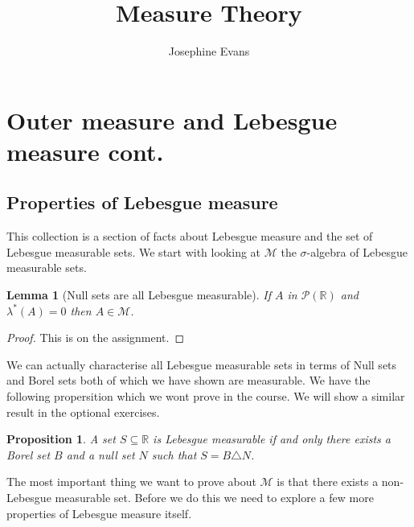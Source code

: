 \documentclass[11pt]{article}
\author{
Josephine Evans
}
\title{Measure Theory}
\newtheorem{lem}[thm]{Lemma}
\newtheorem{prp}[thm]{Proposition}
\theoremstyle{definition}
\theoremstyle{remark}
\begin{document}
\section{Outer measure and Lebesgue measure cont.}
\subsection{Properties of Lebesgue measure}
This collection is a section of facts about Lebesgue measure and the set of Lebesgue measurable sets. We start with looking at $\mathscr{M}$ the $\sigma$-algebra of Lebesgue measurable sets. 

\begin{lem}[Null sets are all Lebesgue measurable]
If $A$ in $\mathscr{P}(\mathbb{R})$ and $\lambda^*(A) =0$ then $A \in \mathscr{M}$.
\end{lem}
\begin{proof}
This is on the assignment. 
\end{proof}

We can actually characterise all Lebesgue measurable sets in terms of Null sets and Borel sets both of which we have shown are measurable. We have the following propersition which we wont prove in the course. We will show a similar result in the optional exercises.
\begin{prp}
A set $S \subseteq \mathbb{R}$ is Lebesgue measurable if and only there exists a Borel set $B$ and a null set $N$ such that $S = B \triangle N$.
\end{prp}
The most important thing we want to prove about $\mathscr{M}$ is that there exists a non-Lebesgue measurable set. Before we do this we need to explore a few more properties of Lebesgue measure itself.
\end{document}
